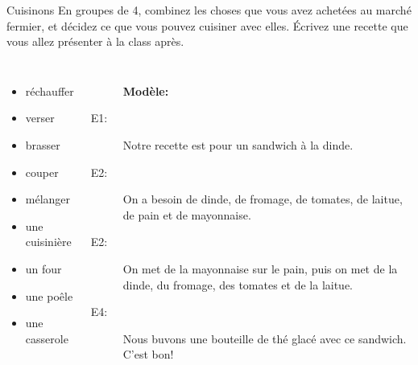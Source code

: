\begin{frame}{Cuisinons}
  En groupes de 4, combinez les choses que vous avez achetées au marché fermier, et décidez ce que vous pouvez cuisiner avec elles.
  Écrivez une recette que vous allez présenter à la class après.
  \begin{columns}
    \footnotesize
      \begin{itemize}
        \item réchauffer 
        \item verser 
        \item brasser 
        \item couper 
        \item mélanger 
        \item une cuisinière 
        \item un four 
        \item une poêle 
        \item une casserole 
      \end{itemize}
      \begin{description}
        \item[] \textbf{Modèle:}
        \item[E1:] Notre recette est pour un sandwich à la dinde.
        \item[E2:] On a besoin de dinde, de fromage, de tomates, de laitue, de pain et de mayonnaise.
        \item[E2:] On met de la mayonnaise sur le pain, puis on met de la dinde, du fromage, des tomates et de la laitue.
        \item[E4:] Nous buvons une bouteille de thé glacé avec ce sandwich. C'est bon!
      \end{description}
  \end{columns}
\end{frame}